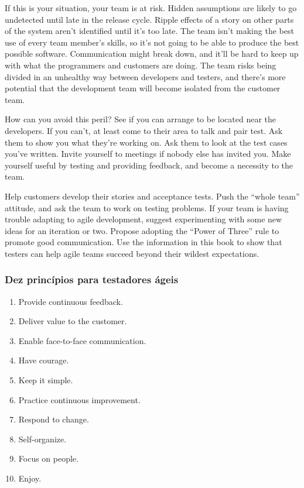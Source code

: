 \documentclass[
	12pt,				%
	openright,			%
	oneside,			%
	a4paper,			%
	english,			%
	brazil,				%
	]{abntex2}
\begin{document}
If this is your situation, your team is at risk. Hidden assumptions are likely to go undetected until late in the release cycle. Ripple effects of a story on other parts of the system aren’t identified until it’s too late. The team isn’t making the best use of every team member’s skills, so it’s not going to be able to produce the best possible software. Communication might break down, and it’ll be hard to keep up with what the programmers and customers are doing. The team risks being divided in an unhealthy way between developers and testers, and there’s more potential that the development team will become isolated from the customer team.

How can you avoid this peril? See if you can arrange to be located near the developers. If you can’t, at least come to their area to talk and pair test. Ask them to show you what they’re working on. Ask them to look at the test cases you’ve written. Invite yourself to meetings if nobody else has invited you. Make yourself useful by testing and providing feedback, and become a necessity to the team.

Help customers develop their stories and acceptance tests. Push the “whole team” attitude, and ask the team to work on testing problems. If your team is having trouble adapting to agile development, suggest experimenting with some new ideas for an iteration or two. Propose adopting the “Power of Three” rule to promote good communication. Use the information in this book to show that testers can help agile teams succeed beyond their wildest expectations.

\subsubsection{Dez princípios para testadores ágeis}
\begin{enumerate}
    \item Provide continuous feedback.
    \item Deliver value to the customer.
    \item Enable face-to-face communication.
    \item Have courage.
    \item Keep it simple.
    \item Practice continuous improvement.
    \item Respond to change.
    \item Self-organize.
    \item Focus on people.
    \item Enjoy.
\end{enumerate}
\end{document}
